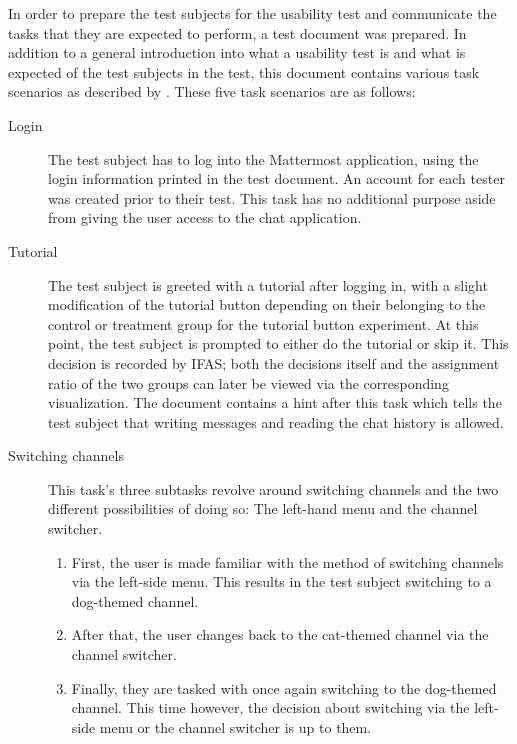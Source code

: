 In order to prepare the test subjects for the usability test and communicate the tasks that they are expected to perform, a test document was prepared.
In addition to a general introduction into what a usability test is and what is expected of the test subjects in the test, this document contains various task scenarios as described by \citet[Prepare Test Materials, pp.~182f]{rubin2008handbook}.
These five task scenarios are as follows:

\begin{description}

\item [Login] The test subject has to log into the Mattermost application, using the login information printed in the test document.
An account for each tester was created prior to their test.
This task has no additional purpose aside from giving the user access to the chat application.

\item [Tutorial] The test subject is greeted with a tutorial after logging in, with a slight modification of the tutorial button depending on their belonging to the control or treatment group for the tutorial button experiment.
At this point, the test subject is prompted to either do the tutorial or skip it.
This decision is recorded by \ac{IFAS}; both the decisions itself and the assignment ratio of the two groups can later be viewed via the corresponding visualization.
The document contains a hint after this task which tells the test subject that writing messages and reading the chat history is allowed.

\item [Switching channels] This task's three subtasks revolve around switching channels and the two different possibilities of doing so: The left-hand menu and the channel switcher.

\begin{enumerate}
\item First, the user is made familiar with the method of switching channels via the left-side menu.
This results in the test subject switching to a dog-themed channel.
\item After that, the user changes back to the cat-themed channel via the channel switcher.
\item Finally, they are tasked with once again switching to the dog-themed channel.
This time however, the decision about switching via the left-side menu or the channel switcher is up to them.
\end{enumerate}


\end{description}
